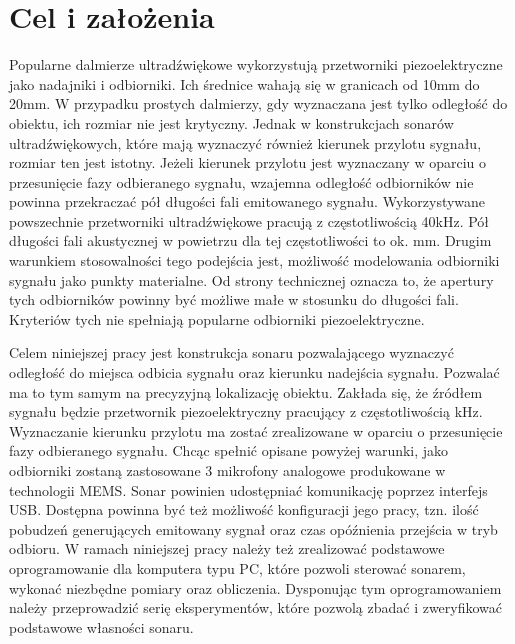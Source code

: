 \chapter{Cel i założenia}\label{chapter:ch_02}

Popularne dalmierze ultradźwiękowe wykorzystują przetworniki piezoelektryczne
jako nadajniki i odbiorniki. Ich średnice wahają się w granicach
od 10mm do 20mm.
W przypadku prostych dalmierzy, gdy wyznaczana jest tylko odległość do
obiektu, ich rozmiar nie jest krytyczny.
Jednak w konstrukcjach sonarów ultradźwiękowych, które mają wyznaczyć
również kierunek przylotu sygnału, rozmiar ten jest istotny.
Jeżeli kierunek przylotu jest wyznaczany w oparciu o przesunięcie
fazy odbieranego sygnału, wzajemna odległość odbiorników nie powinna
przekraczać pół długości fali emitowanego sygnału.
Wykorzystywane powszechnie przetworniki ultradźwiękowe pracują z częstotliwością
40kHz. Pół długości fali akustycznej w powietrzu dla tej częstotliwości
to ok. \unit[4,3]{mm}. Drugim warunkiem stosowalności tego podejścia
jest, możliwość modelowania odbiorniki sygnału jako punkty materialne.
Od strony technicznej oznacza to, że apertury tych odbiorników powinny być
możliwe małe w stosunku do długości fali.
Kryteriów tych nie spełniają popularne odbiorniki piezoelektryczne.

Celem niniejszej pracy jest konstrukcja sonaru pozwalającego wyznaczyć
odległość do miejsca odbicia sygnału oraz kierunku nadejścia sygnału.
Pozwalać ma to tym samym na precyzyjną lokalizację obiektu.
Zakłada się, że źródłem sygnału będzie przetwornik piezoelektryczny
pracujący z częstotliwością \unit[40]{kHz}.
Wyznaczanie kierunku przylotu ma zostać zrealizowane w oparciu
o przesunięcie fazy odbieranego sygnału. Chcąc spełnić opisane powyżej
warunki, jako odbiorniki zostaną zastosowane 3 mikrofony analogowe
produkowane w technologii MEMS.
Sonar powinien udostępniać komunikację poprzez interfejs USB.
Dostępna powinna być też możliwość konfiguracji jego pracy,
tzn. ilość pobudzeń generujących emitowany sygnał oraz czas opóźnienia
przejścia w tryb odbioru.
W ramach niniejszej pracy należy też zrealizować podstawowe oprogramowanie
dla komputera typu PC, które pozwoli sterować sonarem, wykonać
niezbędne pomiary oraz obliczenia. Dysponując tym oprogramowaniem
należy przeprowadzić serię eksperymentów, które pozwolą zbadać i zweryfikować
podstawowe własności sonaru. 
